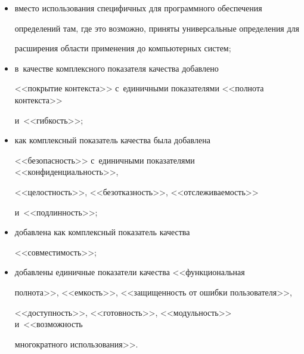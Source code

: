      \begin{itemize}

     \item вместо использования специфичных для программного обеспечения 

определений там, где это возможно, приняты универсальные определения для 

расширения об\-ласти применения до компьютерных систем;

     \item в~качестве комплексного показателя качества добавлено 

<<покрытие кон\-текс\-та>> с~единичными показателями <<полнота контекста>> 

и~<<гиб\-кость>>;



\pagebreak



     \item как комплексный показатель качества была добавлена 

<<безопас\-ность>> с~единичными показателями <<конфиденциальность>>, 

<<це\-лост\-ность>>, <<без\-от\-каз\-ность>>, <<от\-сле\-жи\-ва\-емость>> 

и~<<под\-лин\-ность>>;

     \item добавлена как комплексный показатель качества 

<<совместимость>>;

     \item  добавлены единичные показатели качества <<функциональная 

полнота>>, <<ем\-кость>>, <<за\-щи\-щен\-ность от ошиб\-ки пользователя>>, 

<<до\-ступ\-ность>>, <<го\-тов\-ность>>, <<мо\-дуль\-ность>> и~<<воз\-мож\-ность 

многократного использования>>.

     \end{itemize}

     

